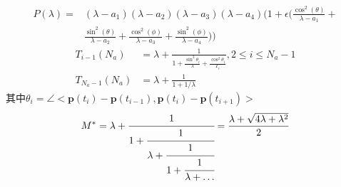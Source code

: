 \documentclass[12pt]{article}
\theoremstyle{remark}
\begin{document}
\title{\textbf{}}

\author{}
\maketitle
\large
\begin{equation}\label{eq:4_characteristic_polynomial}
\begin{split}
P(\lambda)= &(\lambda-a_1)(\lambda-a_2)(\lambda-a_3)(\lambda-a_4)(1+\epsilon(\frac{\cos^2(\theta)}{\lambda-a_1}+\\
 &\frac{\sin^2(\theta)}{\lambda-a_2}+\frac{\cos^2(\phi)}{\lambda-a_3}+\frac{\sin^2(\phi)}{\lambda-a_4}))
\end{split}
\end{equation}
\begin{equation}\label{eq:recursive_efim}
\begin{split}
T_{i-1}(N_a)& =\lambda+\frac{1}{1+\frac{\sin^2\theta_i}{\lambda}+\frac{\cos^2\theta_i}{T_i}},2\leq i\leq N_a-1\\
T_{N_a-1}(N_a)& = \lambda+\frac{1}{1+1/\lambda}
\end{split}
\end{equation}
其中$\theta_i=\angle <\bm{p}(t_i)-\bm{p}(t_{i-1}),\bm{p}(t_i)-\bm{p}(t_{i+1})>$
\begin{equation}\label{eq:starting_or_ending}
M^*=\lambda+\cfrac{1}{1+\cfrac{1}{\lambda+\cfrac{1}{1+\cfrac{1}{\lambda+\dots}}}}
=\frac{\lambda+\sqrt{4\lambda+\lambda^2}}{2}
\end{equation}
\end{document}
